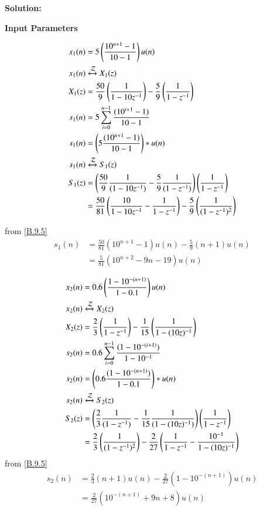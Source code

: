 \documentclass[journal,12pt,twocolumn]{IEEEtran}
\theoremstyle{remark}
\begin{document}
\textbf{Solution:}
\begin{table}[h!]
    \centering
    
    \caption{\textbf{Input Parameters}}
    \label{tab:table_sr5}
\end{table} 
\begin{enumerate}
\begin{align}
x_1(n) &= 5\left(\frac{10^{n+1}-1}{10-1}\right)u(n)\\
x_1(n) & \xleftrightarrow{\mathcal{Z}} X_1(z)\\
X_1(z) &= \frac{50}{9}\left(\frac{1}{1-10z^{-1}}\right)-\frac{5}{9}\left(\frac{1}{1-z^{-1}}\right)\\
s_1(n) &= 5  \sum_{i=0}^{n-1} \frac{(10^{i+1} -1)}{10-1}\\
s_1(n) &= \left(5\frac{(10^{n+1}-1)}{10-1}\right)*u(n)\\
s_1(n) & \xleftrightarrow{\mathcal{Z}} S_1(z)\\
S_1(z) &= \left(\frac{50}{9}\frac{1}{(1-10z^{-1})}-\frac{5}{9}\frac{1}{(1-z^{-1})}\right)\left(\frac{1}{1-z^{-1}}\right)\\
       &=\frac{50}{81}\left(\frac{10}{1-10z^{-1}}-\frac{1}{1-z^{-1}}\right)-\frac{5}{9}\left(\frac{1}{(1-z^{-1})^2}\right)
\end{align}

from \eqref{B.9.5}
\begin{align}
s_1(n) &=\frac{50}{81}(10^{n+1}-1)u(n)-\frac{5}{9}(n+1)u(n)\\
       &=\frac{5}{81}(10^{n+2}-9n-19)u(n)       
\end{align}
\end{enumerate}
\begin{enumerate}
\begin{align}
x_2(n) &= 0.6 \left(\frac{1-10^{-(n+1)}}{1-0.1}\right)u(n)\\
x_2(n) & \xleftrightarrow{\mathcal{Z}} X_2(z)\\
X_2(z) &= \frac{2}{3}\left(\frac{1}{1-z^{-1}}\right)-\frac{1}{15}\left(\frac{1}{1-(10z)^{-1}}\right)\\
s_2(n) &= 0.6 \sum_{i=0}^{n-1} \frac{(1-10^{-(i+1)})}{1-10^{-1}}\\
s_2(n) &= \left(0.6 \frac{(1-10^{-(n+1)})}{1-0.1}\right)*u(n)\\
s_2(n) & \xleftrightarrow{\mathcal{Z}} S_2(z)\\
S_2(z) &= \left(\frac{2}{3}\frac{1}{(1-z^{-1})}-\frac{1}{15}\frac{1}{(1-(10z)^{-1})}\right)\left(\frac{1}{1-z^{-1}}\right)\\
   &=\frac{2}{3}\left(\frac{1}{(1-z^{-1})^2}\right)-\frac{2}{27}\left(\frac{1}{1-z^{-1}}-\frac{10^{-1}}{1-(10z)^{-1}}\right)
 \end{align}
   from \eqref{B.9.5}
\begin{align}
s_2(n) &=\frac{2}{3}(n+1)u(n)-\frac{2}{27}(1-10^{-(n+1)})u(n)\\
       &= \frac{2}{27}(10^{-(n+1)}+9n+8)u(n)
\end{align}
\end{enumerate}
\end{document}

